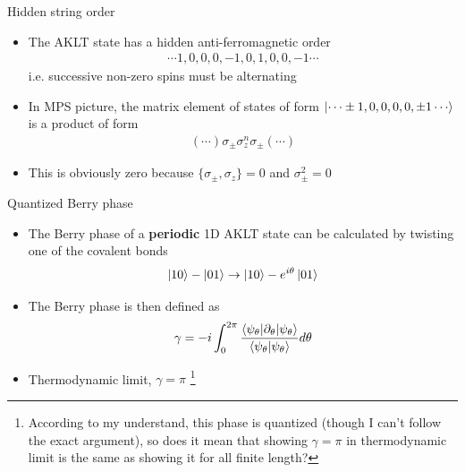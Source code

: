 \documentclass[aspectratio=169,xcolor=dvipsnames, t]{beamer}
\begin{document}
\begin{frame}{Hidden string order}
    \begin{itemize}
        \item The AKLT state has a hidden anti-ferromagnetic order 
        \begin{align*}
            \cdots 1,0,0,0,-1,0,1,0,0,-1\cdots
        \end{align*}
        i.e. successive non-zero spins must be alternating 
        \vspace{.5cm}
        \item In MPS picture, the matrix element of states of form $\ket{\cdots\pm 1,0,0,0,0,\pm 1\cdots}$ is a product of form
        \begin{align*}
            (\cdots) \sigma_{\pm} \sigma_z^n \sigma_{\pm}(\cdots)
        \end{align*}
        \item This is obviously zero because $\{\sigma_\pm,\sigma_z\}=0$ and $\sigma_{\pm}^2=0$
    \end{itemize}
\end{frame}

\begin{frame}{Quantized Berry phase}
    \begin{itemize}
        \item The Berry phase of a \textbf{periodic} 1D AKLT state can be calculated by twisting one of the covalent bonds
        $$\ket{10} - \ket{01}\to \ket{10} - e^{i\theta}\ket{01}$$
        \item The Berry phase is then defined as
        $$\gamma = -i \int_{0}^{2\pi} \frac{\braket{\psi_\theta| \partial_\theta |\psi_\theta}}{\braket{\psi_\theta|\psi_\theta}} d\theta$$
        \item Thermodynamic limit, $\boxed{\gamma = \pi}$ \cite{hatsugai2006quantized}
        \footnote{According to my understand, this phase is quantized (though I can't follow the exact argument), so does it mean that showing $\gamma=\pi$ in thermodynamic limit is the same as showing it for all finite length?}
    \end{itemize}
\end{frame}
\end{document}
